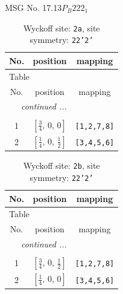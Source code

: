 \documentclass[fleqn,8pt]{jsarticle}
\begin{document}
\setcounter{MaxMatrixCols}{32}

\renewcommand{\tablename}{Table~}
\renewcommand{\figurename}{Figure~}
\begin{center}
\LARGE
MSG No. 17.13\quad$P_{B}222_{1}$
\end{center}
\renewcommand{\arraystretch}{1.2}
\begin{longtable}{ccc}
\caption{Wyckoff site: {\tt 2a}, site symmetry: {\tt 22'2'}}
 \\
 \hline \hline
No. & position & mapping \\ \hline \endfirsthead

\multicolumn{2}{l}{\tablename\ \thetable{}} \\
 \hline \hline
No. & position & mapping \\ \hline \endhead

 \hline \hline
\multicolumn{2}{r}{\footnotesize\it continued ...} \\ \endfoot

 \hline \hline
\multicolumn{2}{r}{} \\ \endlastfoot

1 & $\left[ \frac{3}{4},\, 0,\, 0 \right]$ & {\tt [1,2,7,8]} \\ \hline
2 & $\left[ \frac{1}{4},\, 0,\, \frac{1}{2} \right]$ & {\tt [3,4,5,6]} \\
\end{longtable}
\renewcommand{\arraystretch}{1.2}
\begin{longtable}{ccc}
\caption{Wyckoff site: {\tt 2b}, site symmetry: {\tt 22'2'}}
 \\
 \hline \hline
No. & position & mapping \\ \hline \endfirsthead

\multicolumn{2}{l}{\tablename\ \thetable{}} \\
 \hline \hline
No. & position & mapping \\ \hline \endhead

 \hline \hline
\multicolumn{2}{r}{\footnotesize\it continued ...} \\ \endfoot

 \hline \hline
\multicolumn{2}{r}{} \\ \endlastfoot

1 & $\left[ \frac{3}{4},\, 0,\, \frac{1}{2} \right]$ & {\tt [1,2,7,8]} \\ \hline
2 & $\left[ \frac{1}{4},\, 0,\, 0 \right]$ & {\tt [3,4,5,6]} \\
\end{longtable}
\end{document}
